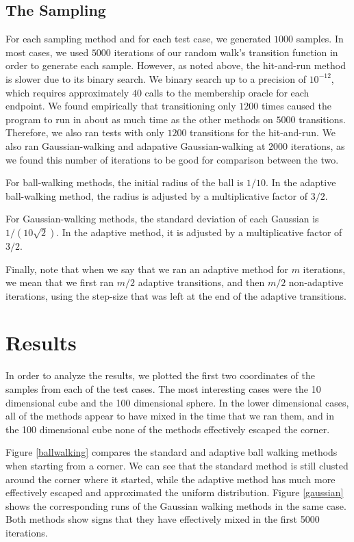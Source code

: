 \documentclass[11pt]{article}
\begin{document}
\subsection{The Sampling}

For each sampling method and for each test case, we generated $1000$ samples. In most cases, we used $5000$ iterations of our random walk's transition function in order to generate each sample. However, as noted above, the hit-and-run method is slower due to its binary search. We binary search up to a precision of $10^{-12}$, which requires approximately $40$ calls to the membership oracle for each endpoint. We found empirically that transitioning only $1200$ times caused the program to run in about as much time as the other methods on $5000$ transitions. Therefore, we also ran tests with only $1200$ transitions for the hit-and-run. We also ran Gaussian-walking and adapative Gaussian-walking at $2000$ iterations, as we found this number of iterations to be good for comparison between the two.

For ball-walking methods, the initial radius of the ball is $1/10$. In the adaptive ball-walking method, the radius is adjusted by a multiplicative factor of $3/2$.

For Gaussian-walking methods, the standard deviation of each Gaussian is $1/(10\sqrt{2})$. In the adaptive method, it is adjusted by a multiplicative factor of $3/2$.

Finally, note that when we say that we ran an adaptive method for $m$ iterations, we mean that we first ran $m/2$ adaptive transitions, and then $m/2$ non-adaptive iterations, using the step-size that was left at the end of the adaptive transitions.

\section{Results}

In order to analyze the results, we plotted the first two coordinates of the samples from each of the test cases. The most interesting cases were the 10 dimensional cube and the 100 dimensional sphere. In the lower dimensional cases, all of the methods appear to have mixed in the time that we ran them, and in the 100 dimensional cube none of the methods effectively escaped the corner.

Figure \ref{ballwalking} compares the standard and adaptive ball walking methods when starting from a corner. We can see that the standard method is still clusted around the corner where it started, while the adaptive method has much more effectively escaped and approximated the uniform distribution.
Figure \ref{gaussian} shows the corresponding runs of the Gaussian walking methods in the same case. Both methods show signs that they have effectively mixed in the first 5000 iterations.
\end{document}
